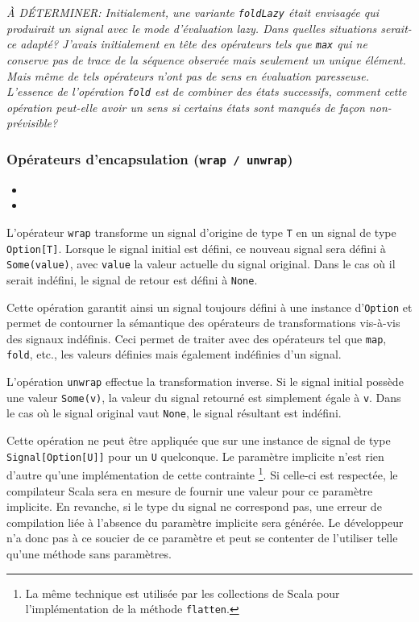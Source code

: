 \textit{À DÉTERMINER: Initialement, une variante \texttt{foldLazy} était envisagée qui produirait un signal avec le mode d'évaluation lazy. Dans quelles situations serait-ce adapté? J'avais initialement en tête des opérateurs tels que \texttt{max} qui ne conserve pas de trace de la séquence observée mais seulement un unique élément. Mais même de tels opérateurs n'ont pas de sens en évaluation paresseuse. L'essence de l'opération \texttt{fold} est de combiner des états successifs, comment cette opération peut-elle avoir un sens si certains états sont manqués de façon non-prévisible?}

\subsubsection{Opérateurs d'encapsulation (\texttt{wrap / unwrap})}

\begin{itemize}
	\item {}
	\item {}
\end{itemize}

L'opérateur \texttt{wrap} transforme un signal d'origine de type \texttt{T} en un signal de type \texttt{Option[T]}. Lorsque le signal initial est défini, ce nouveau signal sera défini à \texttt{Some(value)}, avec \texttt{value} la valeur actuelle du signal original. Dans le cas où il serait indéfini, le signal de retour est défini à \texttt{None}.

Cette opération garantit ainsi un signal toujours défini à une instance d'\texttt{Option} et permet de contourner la sémantique des opérateurs de transformations vis-à-vis des signaux indéfinis. Ceci permet de traiter avec des opérateurs tel que \texttt{map}, \texttt{fold}, etc., les valeurs définies mais également indéfinies d'un signal.

L'opération \texttt{unwrap} effectue la transformation inverse. Si le signal initial possède une valeur \texttt{Some(v)}, la valeur du signal retourné est simplement égale à \texttt{v}. Dans le cas où le signal original vaut \texttt{None}, le signal résultant est indéfini.

Cette opération ne peut être appliquée que sur une instance de signal de type \texttt{Signal[Option[U]]} pour un \texttt{U} quelconque. Le paramètre implicite n'est rien d'autre qu'une implémentation de cette contrainte \footnote{La même technique est utilisée par les collections de Scala pour l'implémentation de la méthode \texttt{flatten}.}. Si celle-ci est respectée, le compilateur Scala sera en mesure de fournir une valeur pour ce paramètre implicite. En revanche, si le type du signal ne correspond pas, une erreur de compilation liée à l'absence du paramètre implicite sera générée. Le développeur n'a donc pas à ce soucier de ce paramètre et peut se contenter de l'utiliser telle qu'une méthode sans paramètres.

